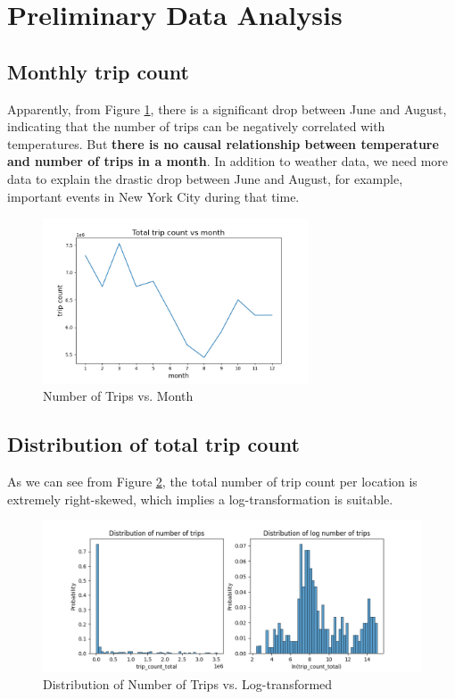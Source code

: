 \documentclass[11pt]{article}
\begin{document}
\section{Preliminary Data Analysis}
\subsection{Monthly trip count}
Apparently, from Figure \ref{fig:monthlytripcount}, there is a significant drop between June and August, indicating that the number of trips can be negatively correlated with temperatures. But \textbf{there is no causal relationship between temperature and number of trips in a month}. In addition to weather data, we need more data to explain the drastic drop between June and August, for example, important events in New York City during that time.
\begin{figure}[h]
    \includegraphics[width=0.7\textwidth]{plots/trip_count_vs_month.png}
    \centering
    \caption{Number of Trips vs. Month}
    \label{fig:monthlytripcount}
\end{figure}
\subsection{Distribution of total trip count}
As we can see from Figure \ref{fig:distributionoftripcount}, the total number of trip count per location is extremely right-skewed, which implies a log-transformation is suitable.
\begin{figure}[h]
    \includegraphics[width=\textwidth]{plots/trip_count_distribution.png}
    \centering
    \caption{Distribution of Number of Trips vs. Log-transformed}
    \label{fig:distributionoftripcount}
\end{figure}
\end{document}
